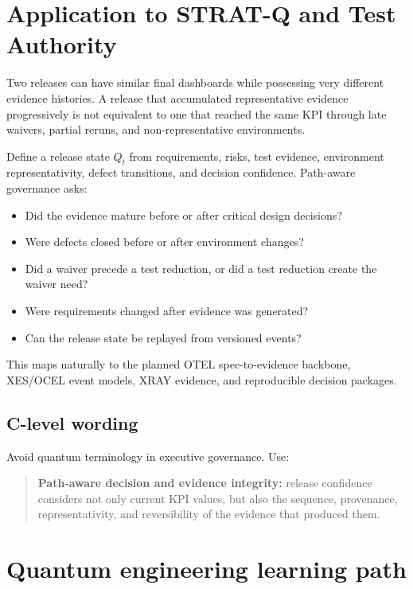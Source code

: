 \section{Application to STRAT-Q and Test Authority}

Two releases can have similar final dashboards while possessing very different evidence histories. A release that accumulated representative evidence progressively is not equivalent to one that reached the same KPI through late waivers, partial reruns, and non-representative environments.

Define a release state $Q_t$ from requirements, risks, test evidence, environment representativity, defect transitions, and decision confidence. Path-aware governance asks:

\begin{itemize}
  \item Did the evidence mature before or after critical design decisions?
  \item Were defects closed before or after environment changes?
  \item Did a waiver precede a test reduction, or did a test reduction create the waiver need?
  \item Were requirements changed after evidence was generated?
  \item Can the release state be replayed from versioned events?
\end{itemize}

This maps naturally to the planned OTEL spec-to-evidence backbone, XES/OCEL event models, XRAY evidence, and reproducible decision packages.

\subsection{C-level wording}

Avoid quantum terminology in executive governance. Use:

\begin{quote}
\textbf{Path-aware decision and evidence integrity:} release confidence considers not only current KPI values, but also the sequence, provenance, representativity, and reversibility of the evidence that produced them.
\end{quote}

\section{Quantum engineering learning path}

